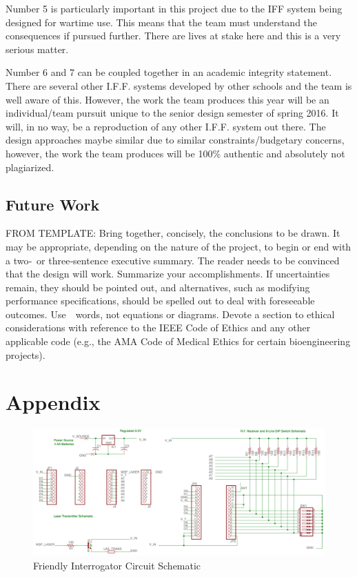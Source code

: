 \documentclass[letterpaper,10pt]{article}
\begin{document}
\begin{spacing}{1.15}
Number 5 is particularly important in this project due to the IFF system being designed for wartime use. This means that the team must understand the consequences if pursued further. There are lives at stake here and this is a very serious matter. 

Number 6 and 7 can be coupled together in an academic integrity statement. There are several other I.F.F. systems developed by other schools and the team is well aware of this. However, the work the team produces this year will be an individual/team pursuit unique to the senior design semester of spring 2016. It will, in no way, be a reproduction of any other I.F.F. system out there. The design approaches maybe similar due to similar constraints/budgetary concerns, however, the work the team produces will be 100\% authentic and absolutely not plagiarized. 
\subsection{Future Work}
FROM TEMPLATE: Bring together, concisely, the conclusions to be drawn. It may be appropriate, depending on the nature of the project, to begin or end with a two‐ or three‐sentence executive summary. The reader needs to be convinced that the design will work. Summarize your accomplishments. If uncertainties remain, they should be pointed out, and alternatives, such as modifying performance specifications, should be spelled out to deal with foreseeable outcomes. Use  words, not equations or diagrams. Devote a section to ethical considerations with reference to the IEEE Code of Ethics and any other applicable code (e.g., the AMA Code of Medical Ethics for certain bioengineering projects).



\clearpage

\clearpage
\section*{Appendix}

\begin{figure} [H]
	\centering
	\includegraphics[scale=0.37]{friendly_interrogator_circuit.png}
	\caption{Friendly Interrogator Circuit Schematic \label{fig:interrogator-schematic}}
\end{figure}


\end{spacing}
\end{document}
